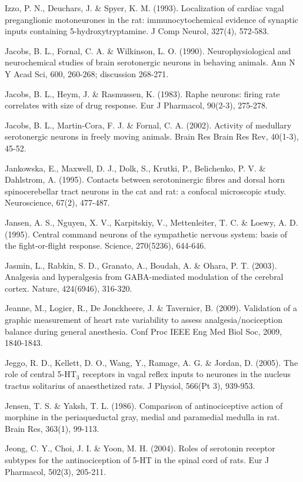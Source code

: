 \documentclass[a4paper,12pt,twoside]{report}
\begin{document}
\begin{singlespacing}
\begin{footnotesize}
Izzo, P. N., Deuchars, J. \& Spyer, K. M. (1993). Localization of cardiac vagal preganglionic motoneurones in the rat: immunocytochemical evidence of synaptic inputs containing 5-hydroxytryptamine. J Comp Neurol, 327(4), 572-583.

Jacobs, B. L., Fornal, C. A. \& Wilkinson, L. O. (1990). Neurophysiological and neurochemical studies of brain serotonergic neurons in behaving animals. Ann N Y Acad Sci, 600, 260-268; discussion 268-271.

Jacobs, B. L., Heym, J. \& Rasmussen, K. (1983). Raphe neurons: firing rate correlates with size of drug response. Eur J Pharmacol, 90(2-3), 275-278.

Jacobs, B. L., Martin-Cora, F. J. \& Fornal, C. A. (2002). Activity of medullary serotonergic neurons in freely moving animals. Brain Res Brain Res Rev, 40(1-3), 45-52.

Jankowska, E., Maxwell, D. J., Dolk, S., Krutki, P., Belichenko, P. V. \& Dahlstrom, A. (1995). Contacts between serotoninergic fibres and dorsal horn spinocerebellar tract neurons in the cat and rat: a confocal microscopic study. Neuroscience, 67(2), 477-487.

Jansen, A. S., Nguyen, X. V., Karpitskiy, V., Mettenleiter, T. C. \& Loewy, A. D. (1995). Central command neurons of the sympathetic nervous system: basis of the fight-or-flight response. Science, 270(5236), 644-646.

Jasmin, L., Rabkin, S. D., Granato, A., Boudah, A. \& Ohara, P. T. (2003). Analgesia and hyperalgesia from GABA-mediated modulation of the cerebral cortex. Nature, 424(6946), 316-320.

Jeanne, M., Logier, R., De Jonckheere, J. \& Tavernier, B. (2009). Validation of a graphic measurement of heart rate variability to assess analgesia/nociception balance during general anesthesia. Conf Proc IEEE Eng Med Biol Soc, 2009, 1840-1843.

Jeggo, R. D., Kellett, D. O., Wang, Y., Ramage, A. G. \& Jordan, D. (2005). The role of central 5-HT$_{3}$ receptors in vagal reflex inputs to neurones in the nucleus tractus solitarius of anaesthetized rats. J Physiol, 566(Pt 3), 939-953.

Jensen, T. S. \& Yaksh, T. L. (1986). Comparison of antinociceptive action of morphine in the periaqueductal gray, medial and paramedial medulla in rat. Brain Res, 363(1), 99-113.

Jeong, C. Y., Choi, J. I. \& Yoon, M. H. (2004). Roles of serotonin receptor subtypes for the antinociception of 5-HT in the spinal cord of rats. Eur J Pharmacol, 502(3), 205-211.


\end{footnotesize}
\end{singlespacing}
\end{document}
